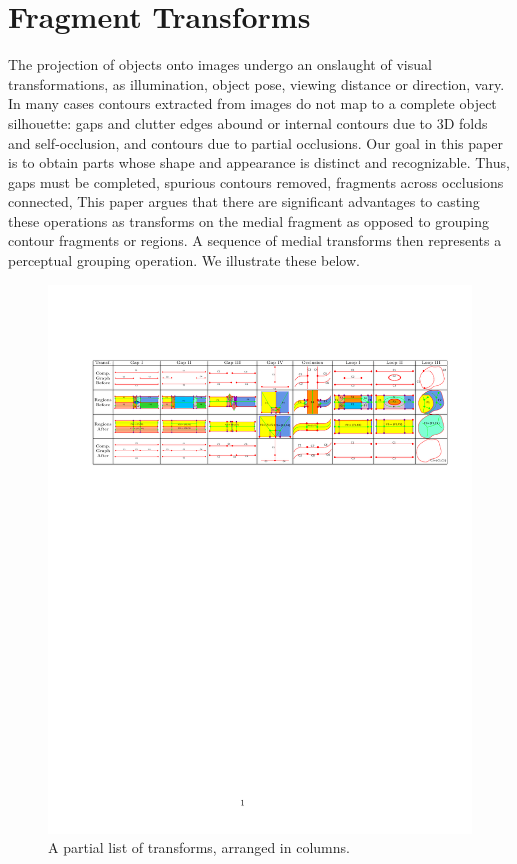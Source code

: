 \section{Fragment Transforms}
\label{sec:transforms}
The projection of objects onto images undergo an onslaught of visual transformations, as illumination, object pose, viewing distance or direction, \etc vary. In many cases contours extracted from images do not map to a complete object silhouette: gaps and clutter edges abound or internal contours due to 3D folds and self-occlusion, and contours due to partial occlusions. Our goal in this paper is to obtain parts whose shape and appearance is distinct and recognizable. Thus, gaps must be completed, spurious
contours removed, fragments across occlusions connected, \etc
This paper argues that there are significant advantages to casting these operations as transforms on the medial fragment as opposed to grouping contour fragments or regions. A sequence of medial transforms  then represents a perceptual grouping operation. We illustrate these below. 

\begin{figure}[ht]
\centering
\includegraphics[width=1.0\linewidth]{figs/list-of-transforms.pdf}
  \caption{A partial list of transforms, arranged in columns. }
  \label{fig:transform:list}
\end{figure}

